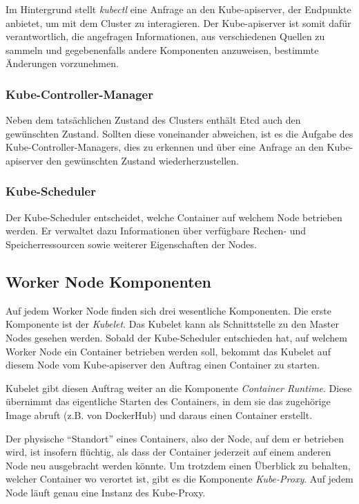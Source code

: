 \documentclass[11pt,a4paper]{article}
\begin{document}
Im Hintergrund stellt \emph{kubectl} eine Anfrage an den Kube-apiserver, der Endpunkte anbietet, 
um mit dem Cluster zu interagieren. Der Kube-apiserver ist somit dafür verantwortlich, die angefragen Informationen,
aus verschiedenen Quellen zu sammeln und gegebenenfalls andere Komponenten anzuweisen, bestimmte Änderungen vorzunehmen.

\subsubsection{Kube-Controller-Manager}
Neben dem tatsächlichen Zustand des Clusters enthält Etcd auch den gewünschten Zustand.
Sollten diese voneinander abweichen, ist es die Aufgabe des Kube-Controller-Managers,
dies zu erkennen und über eine Anfrage an den Kube-apiserver den gewünschten Zustand wiederherzustellen.


\subsubsection{Kube-Scheduler}
\label{sec:Kube-Scheduler}
Der Kube-Scheduler entscheidet, welche Container auf welchem Node betrieben werden.
Er verwaltet dazu Informationen über verfügbare Rechen- und Speicherressourcen sowie weiterer Eigenschaften
der Nodes. 
\subsection{Worker Node Komponenten}

Auf jedem Worker Node finden sich drei wesentliche Komponenten.
Die erste Komponente ist der \emph{Kubelet}. Das Kubelet kann als Schnittstelle
zu den Master Nodes gesehen werden. Sobald der Kube-Scheduler entschieden hat, auf welchem
Worker Node ein Container betrieben werden soll, bekommt das Kubelet auf diesem Node 
vom Kube-apiserver den Auftrag einen Container zu starten.

Kubelet gibt diesen Auftrag weiter an die Komponente \emph{Container Runtime}.
Diese übernimmt das eigentliche Starten des Containers, in dem sie das zugehörige Image
abruft (z.B. von DockerHub) und daraus einen Container erstellt.

Der physische ``Standort'' eines Containers, also der Node, auf dem er betrieben wird, ist insofern
flüchtig, als dass der Container jederzeit auf einem anderen Node neu ausgebracht werden könnte.
Um trotzdem einen Überblick zu behalten, welcher Container wo verortet ist, gibt es die Komponente
\emph{Kube-Proxy}. Auf jedem Node läuft genau eine Instanz des Kube-Proxy.
\end{document}
